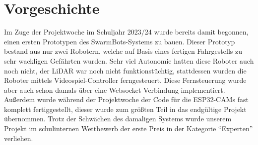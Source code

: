 \chapter{Vorgeschichte}
\label{sec:vorgeschichte}
Im Zuge der Projektwoche im Schuljahr 2023/24 wurde bereits damit begonnen,
einen ersten Prototypen des SwarmBots-Systems zu bauen.
%
Dieser Prototyp bestand aus nur zwei Robotern,
welche auf Basis eines fertigen Fahrgestells zu sehr wackligen Gefährten wurden.
%
Sehr viel Autonomie hatten diese Roboter auch noch nicht,
der LiDAR war noch nicht funktionstüchtig,
stattdessen wurden die Roboter mittels Videospiel-Controller ferngesteuert.
%
Diese Fernsteuerung wurde aber auch schon damals über eine Websocket-Verbindung implementiert.
%
Außerdem wurde während der Projektwoche der Code für die ESP32-CAMs fast komplett fertiggestellt,
dieser wurde zum größten Teil in das endgültige Projekt übernommen.
%
Trotz der Schwächen des damaligen Systems wurde unserem Projekt
im schulinternen Wettbewerb
der erste Preis in der Kategorie ``Experten'' verliehen.


